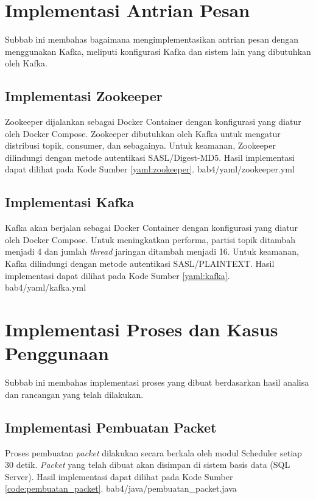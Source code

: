 \section{Implementasi Antrian Pesan}
\par Subbab ini membahas bagaimana mengimplementasikan antrian pesan dengan menggunakan Kafka, meliputi konfigurasi Kafka dan sistem lain yang dibutuhkan oleh Kafka.

\subsection{Implementasi Zookeeper}
\par Zookeeper dijalankan sebagai Docker Container dengan konfigurasi yang diatur oleh Docker Compose. Zookeeper dibutuhkan oleh Kafka untuk mengatur distribusi topik, consumer, dan sebagainya. Untuk keamanan, Zookeeper dilindungi dengan metode autentikasi SASL/Digest-MD5. Hasil implementasi dapat dilihat pada Kode Sumber \ref{yaml:zookeeper}.
 {bab4/yaml/zookeeper.yml}

\subsection{Implementasi Kafka}
\par Kafka akan berjalan sebagai Docker Container dengan konfigurasi yang diatur oleh Docker Compose. Untuk meningkatkan performa, partisi topik ditambah menjadi 4 dan jumlah \textit{thread} jaringan ditambah menjadi 16. Untuk keamanan, Kafka dilindungi dengan metode autentikasi SASL/PLAINTEXT. Hasil implementasi dapat dilihat pada Kode Sumber \ref{yaml:kafka}.
 {bab4/yaml/kafka.yml}

\section{Implementasi Proses dan Kasus Penggunaan}
\par Subbab ini membahas implementasi proses yang dibuat berdasarkan hasil analisa dan rancangan yang telah dilakukan.

\subsection{Implementasi Pembuatan Packet}
\par Proses pembuatan \textit{packet} dilakukan secara berkala oleh modul Scheduler setiap 30 detik. \textit{Packet} yang telah dibuat akan disimpan di sistem basis data (SQL Server). Hasil implementasi dapat dilihat pada Kode Sumber \ref{code:pembuatan_packet}.
 {bab4/java/pembuatan_packet.java}

